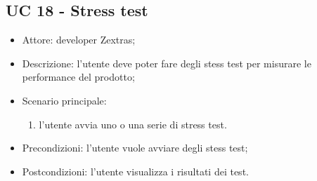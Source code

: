     \subsection{UC 18 - Stress test}
\begin{itemize}
    \item Attore: developer Zextras;
    \item Descrizione: l'utente deve poter fare degli stess test per misurare le performance del prodotto;
    \item Scenario principale:
        \begin{enumerate}
        \item l'utente avvia uno o una serie di stress test. 
        \end{enumerate}
    \item Precondizioni: l'utente vuole avviare degli stess test;
    \item Postcondizioni: l'utente visualizza i risultati dei test.
\end{itemize}

   

    
